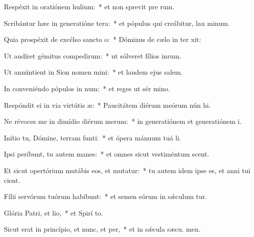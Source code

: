 \item Respéxit in oratiónem hulium:~* et non sprevit pre rum.
\item Scribántur hæc in generatióne tera:~* et pópulus qui creábitur, lau minum.
\item Quia prospéxit de excélso sancto o:~* Dóminus de cælo in ter xit:
\item Ut audíret gémitus compedirum:~* ut sólveret fílios inrum.
\item Ut annúntient in Sion nomen mini:~* et laudem ejus  salem.
\item In conveniéndo pópulos in num:~* et reges ut sér mino.
\item Respóndit ei in via virtútis æ:~* Paucitátem diérum meórum nún hi.
\item Ne révoces me in dimídio diérum merum:~* in generatiónem et generatiónem  i.
\item Inítio tu, Dómine, terram funti:~* et ópera mánuum tuá  li.
\item Ipsi períbunt, tu autem manes:~* et omnes sicut vestiméntum scent.
\item Et sicut opertórium mutábis eos, et mutatur:~* tu autem idem ipse es, et anni tui  cient.
\item Fílii servórum tuórum habibunt:~* et semen eórum in sǽculum tur.
\item Glória Patri, et lio,~* et Spirí to.
\item Sicut erat in princípio, et nunc, et per,~* et in sǽcula sæcu. men.
